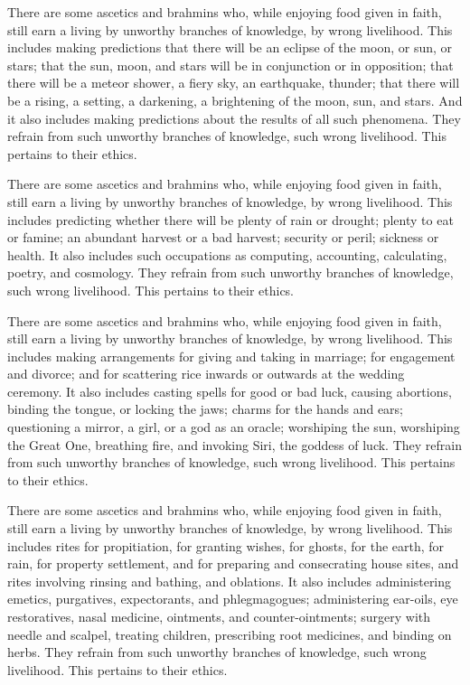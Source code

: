 \documentclass[12pt,openany]{book}%
\begin{document}
There are some ascetics and brahmins who, while enjoying food given in faith, still earn a living by unworthy branches of knowledge, by wrong livelihood. This includes making predictions that there will be an eclipse of the moon, or sun, or stars; that the sun, moon, and stars will be in conjunction or in opposition; that there will be a meteor shower, a fiery sky, an earthquake, thunder; that there will be a rising, a setting, a darkening, a brightening of the moon, sun, and stars. And it also includes making predictions about the results of all such phenomena. They refrain from such unworthy branches of knowledge, such wrong livelihood. This pertains to their ethics. 

There are some ascetics and brahmins who, while enjoying food given in faith, still earn a living by unworthy branches of knowledge, by wrong livelihood. This includes predicting whether there will be plenty of rain or drought; plenty to eat or famine; an abundant harvest or a bad harvest; security or peril; sickness or health. It also includes such occupations as computing, accounting, calculating, poetry, and cosmology. They refrain from such unworthy branches of knowledge, such wrong livelihood. This pertains to their ethics. 

There are some ascetics and brahmins who, while enjoying food given in faith, still earn a living by unworthy branches of knowledge, by wrong livelihood. This includes making arrangements for giving and taking in marriage; for engagement and divorce; and for scattering rice inwards or outwards at the wedding ceremony. It also includes casting spells for good or bad luck, causing abortions, binding the tongue, or locking the jaws; charms for the hands and ears; questioning a mirror, a girl, or a god as an oracle; worshiping the sun, worshiping the Great One, breathing fire, and invoking Siri, the goddess of luck. They refrain from such unworthy branches of knowledge, such wrong livelihood. This pertains to their ethics. 

There are some ascetics and brahmins who, while enjoying food given in faith, still earn a living by unworthy branches of knowledge, by wrong livelihood. This includes rites for propitiation, for granting wishes, for ghosts, for the earth, for rain, for property settlement, and for preparing and consecrating house sites, and rites involving rinsing and bathing, and oblations. It also includes administering emetics, purgatives, expectorants, and phlegmagogues; administering ear-oils, eye restoratives, nasal medicine, ointments, and counter-ointments; surgery with needle and scalpel, treating children, prescribing root medicines, and binding on herbs. They refrain from such unworthy branches of knowledge, such wrong livelihood. This pertains to their ethics. 
\end{document}
